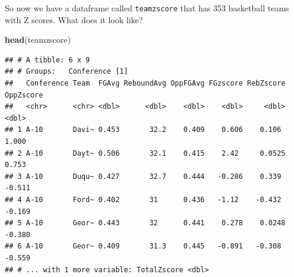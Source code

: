\documentclass[]{book}
\newenvironment{Shaded}{\begin{snugshade}}{\end{snugshade}}
\newcommand{\KeywordTok}[1]{\textcolor[rgb]{0.13,0.29,0.53}{\textbf{#1}}}
\newcommand{\DataTypeTok}[1]{\textcolor[rgb]{0.13,0.29,0.53}{#1}}
\newcommand{\DecValTok}[1]{\textcolor[rgb]{0.00,0.00,0.81}{#1}}
\newcommand{\StringTok}[1]{\textcolor[rgb]{0.31,0.60,0.02}{#1}}
\newcommand{\OtherTok}[1]{\textcolor[rgb]{0.56,0.35,0.01}{#1}}
\newcommand{\OperatorTok}[1]{\textcolor[rgb]{0.81,0.36,0.00}{\textbf{#1}}}
\newcommand{\NormalTok}[1]{#1}
\begin{document}
\begin{Shaded}
\end{Shaded}

So now we have a dataframe called \texttt{teamzscore} that has 353
basketball teams with Z scores. What does it look like?

\begin{Shaded}
\begin{Highlighting}[]
\KeywordTok{head}\NormalTok{(teamzscore)}
\end{Highlighting}
\end{Shaded}

\begin{verbatim}
## # A tibble: 6 x 9
## # Groups:   Conference [1]
##   Conference Team  FGAvg ReboundAvg OppFGAvg FGzscore RebZscore OppZscore
##   <chr>      <chr> <dbl>      <dbl>    <dbl>    <dbl>     <dbl>     <dbl>
## 1 A-10       Davi~ 0.453       32.2    0.409    0.606    0.106      1.000
## 2 A-10       Dayt~ 0.506       32.1    0.415    2.42     0.0525     0.753
## 3 A-10       Duqu~ 0.427       32.7    0.444   -0.286    0.339     -0.511
## 4 A-10       Ford~ 0.402       31      0.436   -1.12    -0.432     -0.169
## 5 A-10       Geor~ 0.443       32      0.441    0.278    0.0248    -0.380
## 6 A-10       Geor~ 0.409       31.3    0.445   -0.891   -0.308     -0.559
## # ... with 1 more variable: TotalZscore <dbl>
\end{verbatim}
\end{document}
